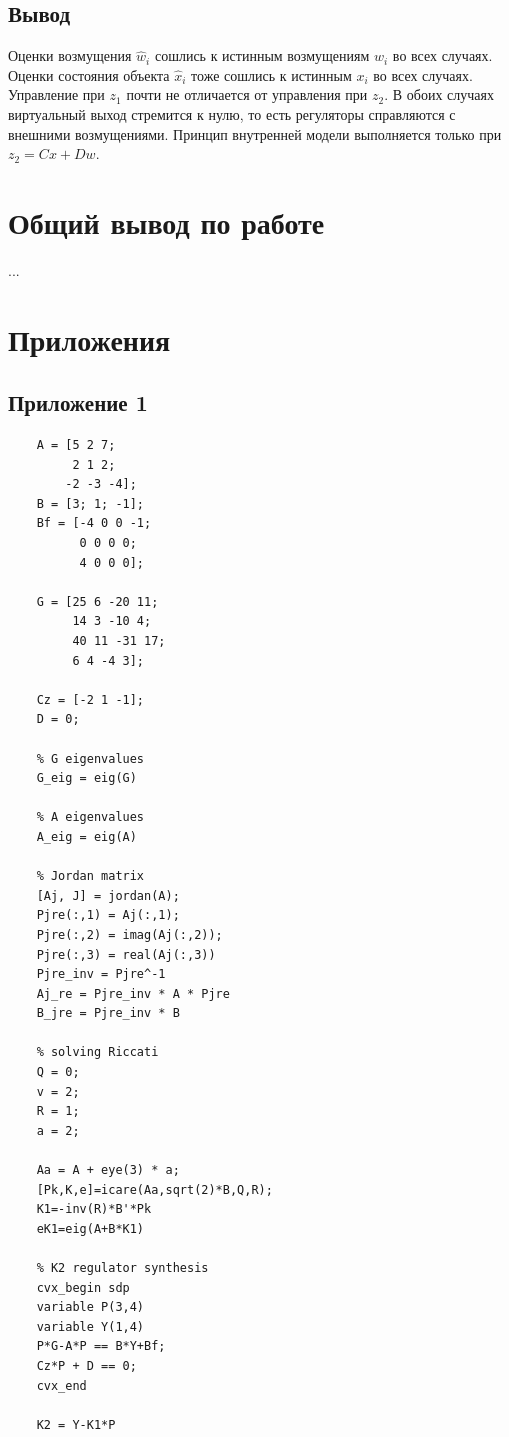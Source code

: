\documentclass[a4paper, 12pt]{article}
\begin{document}
    \subsection{Вывод}
    Оценки возмущения $\hat{w}_i$ сошлись к истинным возмущениям $w_i$ во всех случаях.
    Оценки состояния объекта $\hat{x}_i$ тоже сошлись к истинным $x_i$ во всех случаях.
    Управление при $z_1$ почти не отличается от управления при $z_2$. В обоих случаях
    виртуальный выход стремится к нулю, то есть регуляторы справляются с внешними
    возмущениями. Принцип внутренней модели выполняется только при $z_2=Cx+Dw$.


    \section{Общий вывод по работе}
    ...


    \section{Приложения}
    \subsection{Приложение 1}
    \begin{lstlisting}[label=task1, caption={Программа для задания 1}]
    % plant parameters
    A = [5 2 7;
         2 1 2;
        -2 -3 -4];
    B = [3; 1; -1];
    Bf = [-4 0 0 -1;
          0 0 0 0;
          4 0 0 0];

    G = [25 6 -20 11;
         14 3 -10 4;
         40 11 -31 17;
         6 4 -4 3];

    Cz = [-2 1 -1];
    D = 0;

    % G eigenvalues
    G_eig = eig(G)

    % A eigenvalues
    A_eig = eig(A)

    % Jordan matrix
    [Aj, J] = jordan(A);
    Pjre(:,1) = Aj(:,1);
    Pjre(:,2) = imag(Aj(:,2));
    Pjre(:,3) = real(Aj(:,3))
    Pjre_inv = Pjre^-1
    Aj_re = Pjre_inv * A * Pjre
    B_jre = Pjre_inv * B

    % solving Riccati
    Q = 0;
    v = 2;
    R = 1;
    a = 2;

    Aa = A + eye(3) * a;
    [Pk,K,e]=icare(Aa,sqrt(2)*B,Q,R);
    K1=-inv(R)*B'*Pk
    eK1=eig(A+B*K1)

    % K2 regulator synthesis
    cvx_begin sdp
    variable P(3,4)
    variable Y(1,4)
    P*G-A*P == B*Y+Bf;
    Cz*P + D == 0;
    cvx_end

    K2 = Y-K1*P
    \end{lstlisting}
\end{document}
